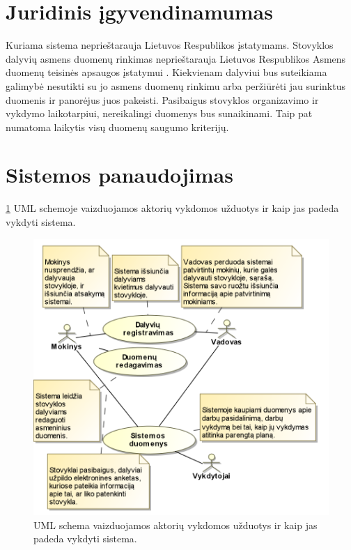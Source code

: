 \section{Juridinis įgyvendinamumas}

Kuriama sistema neprieštarauja Lietuvos Respublikos įstatymams. Stovyklos 
dalyvių asmens duomenų rinkimas neprieštarauja Lietuvos Respublikos 
Asmens duomenų teisinės apsaugos įstatymui \cite{istat_duom_apsaug}.
Kiekvienam dalyviui bus 
suteikiama galimybė nesutikti su jo asmens duomenų rinkimu arba 
peržiūrėti jau surinktus duomenis ir panorėjus juos pakeisti. 
Pasibaigus stovyklos organizavimo ir vykdymo laikotarpiui, nereikalingi 
duomenys bus sunaikinami. Taip pat numatoma laikytis visų duomenų saugumo 
kriterijų.

\section{Sistemos panaudojimas}

\ref{fig:uml_tasks} UML schemoje vaizduojamos aktorių vykdomos užduotys ir 
kaip jas padeda vykdyti sistema.

\begin{figure}[h!]
  \begin{center}
    \includegraphics[width=1.0\linewidth]{images/sistemos_panaudojimas.png}
  \end{center}
  \caption{UML schema vaizduojamos aktorių vykdomos užduotys ir kaip jas
    padeda vykdyti sistema.}
  \label{fig:uml_tasks}
\end{figure}

